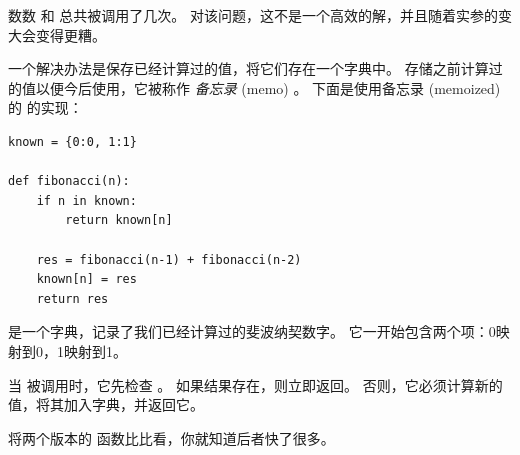   


数数  和  总共被调用了几次。
对该问题，这不是一个高效的解，并且随着实参的变大会变得更糟。



一个解决办法是保存已经计算过的值，将它们存在一个字典中。
存储之前计算过的值以便今后使用，它被称作 {\em 备忘录} (memo) 。
下面是使用备忘录 (memoized) 的  的实现：

\begin{lstlisting}
known = {0:0, 1:1}

def fibonacci(n):
    if n in known:
        return known[n]

    res = fibonacci(n-1) + fibonacci(n-2)
    known[n] = res
    return res
\end{lstlisting}

%

 是一个字典，记录了我们已经计算过的斐波纳契数字。
它一开始包含两个项：0映射到0，1映射到1。


当  被调用时，它先检查  。 如果结果存在，则立即返回。 否则，它必须计算新的值，将其加入字典，并返回它。


将两个版本的  函数比比看，你就知道后者快了很多。


